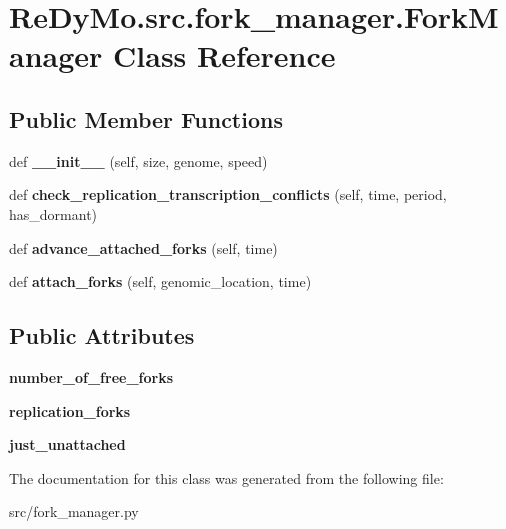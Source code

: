 \hypertarget{classReDyMo_1_1src_1_1fork__manager_1_1ForkManager}{}\section{Re\+Dy\+Mo.\+src.\+fork\+\_\+manager.\+Fork\+Manager Class Reference}
\label{classReDyMo_1_1src_1_1fork__manager_1_1ForkManager}
\subsection*{Public Member Functions}
\begin{DoxyCompactItemize}
\item 
\mbox{\label{classReDyMo_1_1src_1_1fork__manager_1_1ForkManager_a199088d11b6ef93913a4dc3db2086e90}} 
def {\bfseries \+\_\+\+\_\+init\+\_\+\+\_\+} (self, size, genome, speed)
\item 
\mbox{\label{classReDyMo_1_1src_1_1fork__manager_1_1ForkManager_a1a5940ebd74e69fefb9f7cc00ab79737}} 
def {\bfseries check\+\_\+replication\+\_\+transcription\+\_\+conflicts} (self, time, period, has\+\_\+dormant)
\item 
\mbox{\label{classReDyMo_1_1src_1_1fork__manager_1_1ForkManager_a78145066ccb9f6b3d86bb0c08aed2bb6}} 
def {\bfseries advance\+\_\+attached\+\_\+forks} (self, time)
\item 
\mbox{\label{classReDyMo_1_1src_1_1fork__manager_1_1ForkManager_a8cf93e36729878575dfecba9978f357a}} 
def {\bfseries attach\+\_\+forks} (self, genomic\+\_\+location, time)
\end{DoxyCompactItemize}
\subsection*{Public Attributes}
\begin{DoxyCompactItemize}
\item 
\mbox{\label{classReDyMo_1_1src_1_1fork__manager_1_1ForkManager_ad12c386723c59b2ecb1eaadb28c437bb}} 
{\bfseries number\+\_\+of\+\_\+free\+\_\+forks}
\item 
\mbox{\label{classReDyMo_1_1src_1_1fork__manager_1_1ForkManager_a7aecf39ae941edfe12a72d644549a5c0}} 
{\bfseries replication\+\_\+forks}
\item 
\mbox{\label{classReDyMo_1_1src_1_1fork__manager_1_1ForkManager_a1f453944009a835815c3600293961cd5}} 
{\bfseries just\+\_\+unattached}
\end{DoxyCompactItemize}


The documentation for this class was generated from the following file\+:\begin{DoxyCompactItemize}
\item 
src/fork\+\_\+manager.\+py\end{DoxyCompactItemize}
